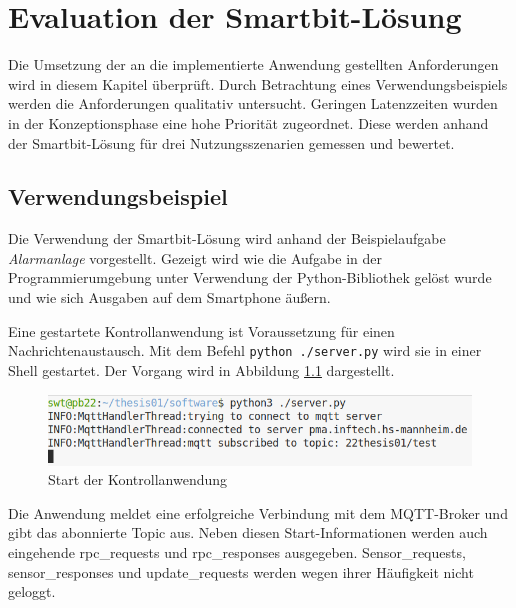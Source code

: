 \documentclass[11pt,a4paper]{report}
\begin{document}
\chapter{Evaluation der Smartbit-Lösung}\label{chap:eval}
Die Umsetzung der an die implementierte Anwendung gestellten Anforderungen wird in diesem Kapitel überprüft.
Durch Betrachtung eines Verwendungsbeispiels werden die Anforderungen qualitativ untersucht.
Geringen Latenzzeiten wurden in der Konzeptionsphase eine hohe Priorität zugeordnet.
Diese werden anhand der Smartbit-Lösung für drei Nutzungsszenarien gemessen und bewertet.


\section{Verwendungsbeispiel}
Die Verwendung der Smartbit-Lösung wird anhand der Beispielaufgabe \textit{Alarmanlage} vorgestellt.
Gezeigt wird wie die Aufgabe in der Programmierumgebung unter Verwendung der Python-Bibliothek gelöst wurde und wie sich Ausgaben auf dem Smartphone äußern.

Eine gestartete Kontrollanwendung ist Voraussetzung für einen Nachrichtenaustausch.
Mit dem Befehl \texttt{python ./server.py} wird sie in einer Shell gestartet.
Der Vorgang wird in Abbildung \ref{fig:start_controll_app} dargestellt.
\begin{figure}[htbp]
  \centering
  \includegraphics[width=.8\textwidth]{images/server_logging}
  \caption{Start der Kontrollanwendung}
  \label{fig:start_controll_app}
\end{figure}
Die Anwendung meldet eine erfolgreiche Verbindung mit dem MQTT-Broker und gibt das abonnierte Topic aus.
Neben diesen Start-Informationen werden auch eingehende rpc\_requests und rpc\_responses ausgegeben.
Sensor\_requests, sensor\_responses und update\_requests werden wegen ihrer Häufigkeit nicht geloggt.
\end{document}
